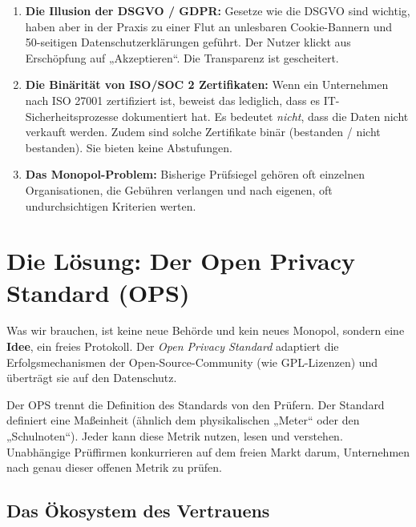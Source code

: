 \documentclass[11pt, a4paper]{article}
\begin{document}
	\begin{enumerate}
		\item \textbf{Die Illusion der DSGVO / GDPR:} Gesetze wie die DSGVO sind wichtig, haben aber in der Praxis zu einer Flut an unlesbaren Cookie-Bannern und 50-seitigen Datenschutzerklärungen geführt. Der Nutzer klickt aus Erschöpfung auf „Akzeptieren“. Die Transparenz ist gescheitert.
		\item \textbf{Die Binärität von ISO/SOC 2 Zertifikaten:} Wenn ein Unternehmen nach ISO 27001 zertifiziert ist, beweist das lediglich, dass es IT-Sicherheitsprozesse dokumentiert hat. Es bedeutet \textit{nicht}, dass die Daten nicht verkauft werden. Zudem sind solche Zertifikate binär (bestanden / nicht bestanden). Sie bieten keine Abstufungen.
		\item \textbf{Das Monopol-Problem:} Bisherige Prüfsiegel gehören oft einzelnen Organisationen, die Gebühren verlangen und nach eigenen, oft undurchsichtigen Kriterien werten. 
	\end{enumerate}
	
	\section{Die Lösung: Der Open Privacy Standard (OPS)}
	
	Was wir brauchen, ist keine neue Behörde und kein neues Monopol, sondern eine \textbf{Idee}, ein freies Protokoll. Der \textit{Open Privacy Standard} adaptiert die Erfolgsmechanismen der Open-Source-Community (wie GPL-Lizenzen) und überträgt sie auf den Datenschutz.
	
	Der OPS trennt die Definition des Standards von den Prüfern. Der Standard definiert eine Maßeinheit (ähnlich dem physikalischen „Meter“ oder den „Schulnoten“). Jeder kann diese Metrik nutzen, lesen und verstehen. Unabhängige Prüffirmen konkurrieren auf dem freien Markt darum, Unternehmen nach genau dieser offenen Metrik zu prüfen. 
	
	\subsection{Das Ökosystem des Vertrauens}
	
\end{document}
